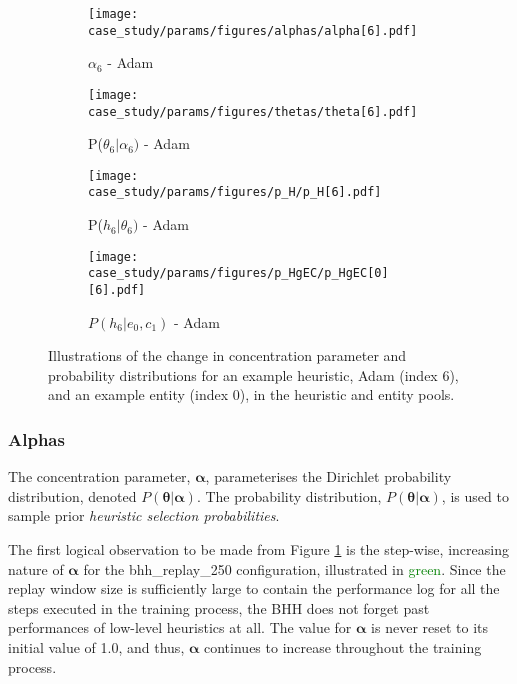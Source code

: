 \begin{figure}[H]
	\begin{subfigure}{0.5\textwidth}
		\centering
		\texttt{[image: case\_study/params/figures/alphas/alpha[6].pdf]}
		\caption{$\alpha_{6}$ - \acs{Adam}}
		\label{fig:results:case_study:alphas:6}
	\end{subfigure}
	\begin{subfigure}{0.5\textwidth}
		\centering
		\texttt{[image: case\_study/params/figures/thetas/theta[6].pdf]}
		\caption{P($\theta_{6} \vert \alpha_{6})$ - \acs{Adam}}
		\label{fig:results:case_study:thetas:6}
	\end{subfigure}
	\par\bigskip
	\begin{subfigure}{0.5\textwidth}
		\centering
		\texttt{[image: case\_study/params/figures/p\_H/p\_H[6].pdf]}
		\caption{P($h_{6} \vert \theta_{6})$ - \acs{Adam}}
		\label{fig:results:case_study:p_H:6}
	\end{subfigure}
	\begin{subfigure}{0.5\textwidth}
		\centering
		\texttt{[image: case\_study/params/figures/p\_HgEC/p\_HgEC[0][6].pdf]}
		\caption{$P(h_{6} \vert e_{0}, c_{1})$ - \acs{Adam}}
		\label{fig:results:case_study:p_HgEC:0:6}
	\end{subfigure}
	\par\bigskip
	\caption{Illustrations of the change in concentration parameter and probability distributions for an example heuristic, \acs{Adam} (index 6), and an example entity (index 0), in the heuristic and entity pools.}
	\label{fig:results:case_study}
\end{figure}

\subsubsection{Alphas}\label{sec:results:case_study:alphas}

The concentration parameter, $\boldsymbol{\alpha}$, parameterises the Dirichlet probability distribution, denoted $P(\boldsymbol{\theta} \vert \boldsymbol{\alpha})$. The probability distribution, $P(\boldsymbol{\theta} \vert \boldsymbol{\alpha})$, is used to sample prior \textit{heuristic selection probabilities}.

The first logical observation to be made from Figure \ref{fig:results:case_study:alphas:6} is the step-wise, increasing nature of $\boldsymbol{\alpha}$ for the bhh\_replay\_250 configuration, illustrated in \textcolor{green}{green}. Since the replay window size is sufficiently large to contain the performance log for all the steps executed in the training process, the \acs{BHH} does not forget past performances of low-level heuristics at all. The value for $\boldsymbol{\alpha}$ is never reset to its initial value of 1.0, and thus, $\boldsymbol{\alpha}$ continues to increase throughout the training process.

